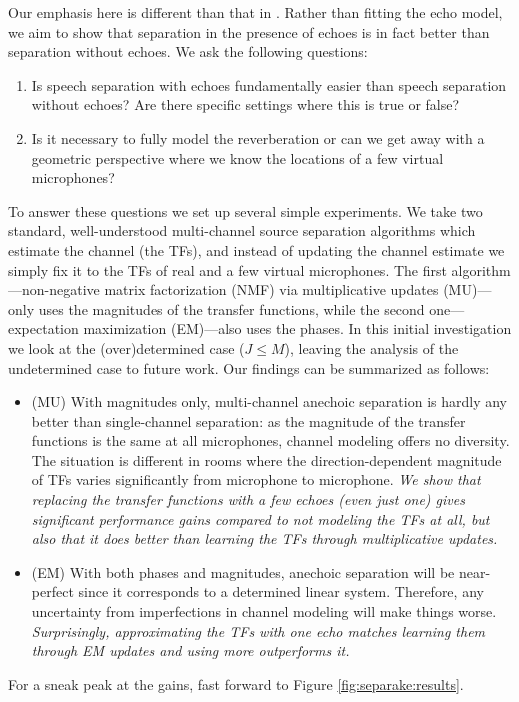 Our emphasis here is different than that in \cite{leglaive2015multichannel}.
Rather than fitting the echo model, we aim to show that separation in the presence of echoes is in fact better than separation without echoes.
We ask the following questions:
\begin{enumerate}
    \item Is speech separation with echoes fundamentally easier than speech separation without echoes?
    Are there specific settings where this is true or false?
    \item Is it necessary to fully model the reverberation or can we get away with a geometric perspective where we know the locations of a few virtual microphones?
\end{enumerate}
To answer these questions we set up several simple experiments.
We take two standard, well-understood multi-channel source separation algorithms which estimate the channel (the TFs),
and instead of updating the channel estimate we simply fix it to the TFs of real and a few virtual microphones.
The first algorithm---non-negative matrix factorization (NMF) via multiplicative updates (MU)---only uses the magnitudes of the transfer functions,
while the second one---expectation maximization (EM)---also uses the phases.
In this initial investigation we look at the (over)determined case ($J \leq M$),
leaving the analysis of the undetermined case to future work. Our findings can be summarized as follows:
\begin{itemize}
    \item (MU) With magnitudes only, multi-channel anechoic separation is hardly any better than single-channel separation:
    as the magnitude of the transfer functions is the same at all microphones, channel modeling offers no diversity.
    The situation is different in rooms where the direction-dependent magnitude of TFs varies significantly from microphone to microphone.
    \textit{We show that replacing the transfer functions with a few echoes (even just one) gives significant performance gains compared to not modeling the TFs at all,
    but also that it does better than learning the TFs through multiplicative updates.}
    \item (EM) With both phases and magnitudes, anechoic separation will be near-perfect since it corresponds to a determined linear system.
    Therefore, any uncertainty from imperfections in channel modeling will make things worse.
    \textit{Surprisingly, approximating the TFs with one echo matches learning them through EM updates and using more outperforms it.}
\end{itemize}
For a sneak peak at the gains, fast forward to Figure \ref{fig:separake:results}.


